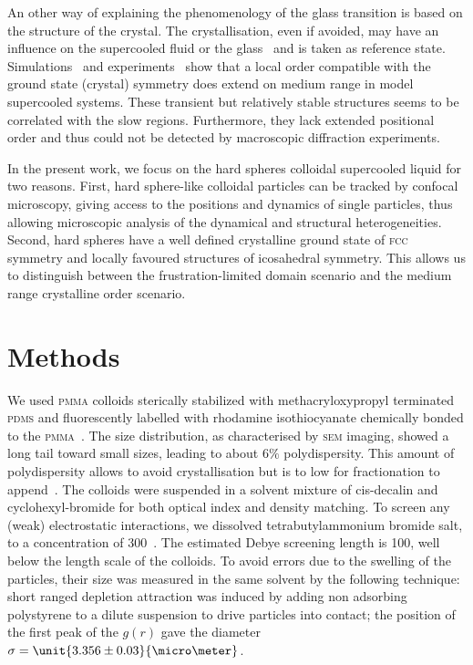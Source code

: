 \documentclass[11pt,a4paper]{article}
\begin{document}
An other way of explaining the phenomenology of the glass transition is based on the structure of the crystal. The crystallisation, even if avoided, may have an influence on the supercooled fluid or the glass~\citep{tanaka1999top, Cavagna2003} and is taken as reference state. Simulations~\cite{kawasaki2007cbd, Kawasaki2010, Pedersen2010, Coslovich2011} and experiments~\citep{watanabe2008} show that a local order compatible with the ground state (crystal) symmetry does extend on medium range in model supercooled systems. These transient but relatively stable structures seems to be correlated with the slow regions. Furthermore, they lack extended positional order and thus could not be detected by macroscopic diffraction experiments.

In the present work, we focus on the hard spheres colloidal supercooled liquid for two reasons. First, hard sphere-like colloidal particles can be tracked by confocal microscopy, giving access to the positions and dynamics of single particles, thus allowing microscopic analysis of the dynamical and structural heterogeneities. Second, hard spheres have a well defined crystalline ground state of \textsc{fcc} symmetry and locally favoured structures of icosahedral symmetry. This allows us to distinguish between the frustration-limited domain scenario and the medium range crystalline order scenario.


\section*{Methods}

We used \textsc{pmma} colloids sterically stabilized with methacryloxypropyl terminated \textsc{pdms} and fluorescently labelled with rhodamine isothiocyanate chemically bonded to the \textsc{pmma}~\citep{bosma2002}. The size distribution, as characterised by \textsc{sem} imaging, showed a long tail toward small sizes, leading to about $6\%$ polydispersity. This amount of polydispersity allows to avoid crystallisation but is to low for fractionation to append~\citep{Fasolo2003}. The colloids were suspended in a solvent mixture of cis-decalin and cyclohexyl-bromide for both optical index and density matching. To screen any (weak) electrostatic interactions, we dissolved tetrabutylammonium bromide salt, to a concentration of \unit{300}{\nano\mole\per\liter}~\citep{royall2005}. The estimated Debye screening length is \unit{100}{\nano\metre}, well below the length scale of the colloids. To avoid errors due to the swelling of the particles, their size was measured in the same solvent by the following technique: short ranged depletion attraction was induced by adding non adsorbing polystyrene to a dilute suspension to drive particles into contact; the position of the first peak of the $g(r)$ gave the diameter $\sigma = \unit{3.356\pm0.03}{\micro\meter}$.
\end{document}
